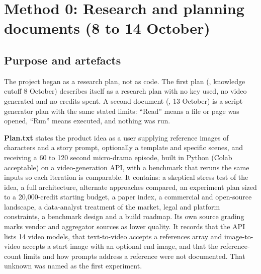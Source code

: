 \documentclass[11pt,a4paper]{article}
\newcommand{\code}[1]{\texttt{\detokenize{#1}}}
\begin{document}
\section{Method 0: Research and planning documents (8 to 14 October)}
\subsection{Purpose and artefacts}
The project began as a research plan, not as code. The first plan (\code{Plan.txt}, knowledge cutoff 8 October) describes itself as a research plan with no key used, no video generated and no credits spent. A second document (\code{1stdraft.md}, 13 October) is a script-generator plan with the same stated limits: ``Read'' means a file or page was opened, ``Run'' means executed, and nothing was run.

\textbf{Plan.txt} states the product idea as a user supplying reference images of characters and a story prompt, optionally a template and specific scenes, and receiving a 60 to 120 second micro-drama episode, built in Python (Colab acceptable) on a video-generation API, with a benchmark that reruns the same inputs so each iteration is comparable. It contains: a skeptical stress test of the idea, a full architecture, alternate approaches compared, an experiment plan sized to a 20,000-credit starting budget, a paper index, a commercial and open-source landscape, a data-analyst treatment of the market, legal and platform constraints, a benchmark design and a build roadmap. Its own source grading marks vendor and aggregator sources as lower quality. It records that the API lists 14 video models, that text-to-video accepts a references array and image-to-video accepts a start image with an optional end image, and that the reference-count limits and how prompts address a reference were not documented. That unknown was named as the first experiment.
\end{document}
